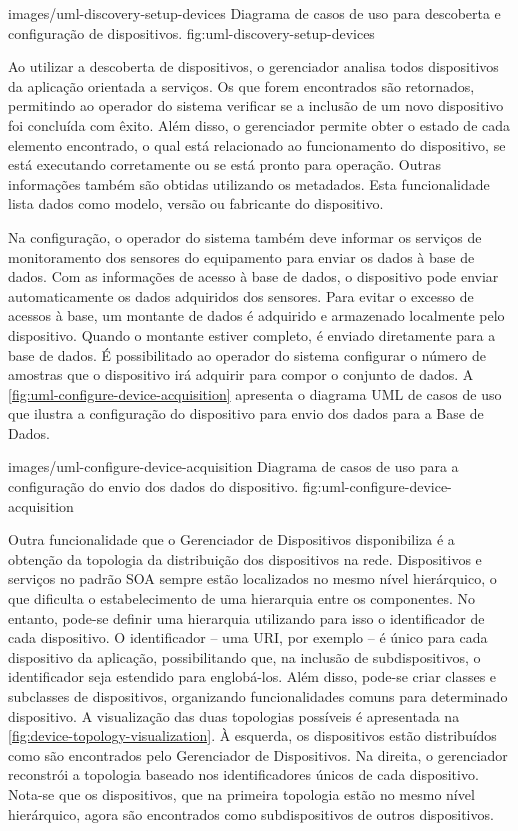   {images/uml-discovery-setup-devices}
  {Diagrama de casos de uso para descoberta e configuração de dispositivos.}
  {fig:uml-discovery-setup-devices}

Ao utilizar a descoberta de dispositivos, o gerenciador analisa todos dispositivos da aplicação
orientada a serviços. Os que forem encontrados são retornados, permitindo ao operador do sistema
verificar se a inclusão de um novo dispositivo foi concluída com êxito. Além disso, o gerenciador
permite obter o estado de cada elemento encontrado, o qual está relacionado ao funcionamento do
dispositivo, se está executando corretamente ou se está pronto para operação. Outras informações
também são obtidas utilizando os metadados. Esta funcionalidade lista dados como modelo, versão ou
fabricante do dispositivo.

Na configuração, o operador do sistema também deve informar os serviços de monitoramento dos
sensores do equipamento para enviar os dados à base de dados. Com as informações de acesso à base de
dados, o dispositivo pode enviar automaticamente os dados adquiridos dos sensores. Para evitar o
excesso de acessos à base, um montante de dados é adquirido e armazenado localmente pelo
dispositivo. Quando o montante estiver completo, é enviado diretamente para a base de dados. É
possibilitado ao operador do sistema configurar o número de amostras que o dispositivo irá adquirir
para compor o conjunto de dados. A \cref{fig:uml-configure-device-acquisition} apresenta o diagrama
\gls{UML} de casos de uso que ilustra a configuração do dispositivo para envio dos dados para a Base
de Dados.

  {images/uml-configure-device-acquisition}
  {Diagrama de casos de uso para a configuração do envio dos dados do dispositivo.}
  {fig:uml-configure-device-acquisition}

Outra funcionalidade que o Gerenciador de Dispositivos disponibiliza é a obtenção da topologia da
distribuição dos dispositivos na rede. Dispositivos e serviços no padrão \gls{SOA} sempre estão
localizados no mesmo nível hierárquico, o que dificulta o estabelecimento de uma hierarquia entre os
componentes. No entanto, pode-se definir uma hierarquia utilizando para isso o identificador de cada
dispositivo. O identificador -- uma \gls{URI}, por exemplo -- é único para cada dispositivo da
aplicação, possibilitando que, na inclusão de subdispositivos, o identificador seja estendido para
englobá-los. Além disso, pode-se criar classes e subclasses de dispositivos, organizando
funcionalidades comuns para determinado dispositivo. A visualização das duas topologias possíveis é
apresentada na \cref{fig:device-topology-visualization}. À esquerda, os dispositivos estão
distribuídos como são encontrados pelo Gerenciador de Dispositivos. Na direita, o gerenciador
reconstrói a topologia baseado nos identificadores únicos de cada dispositivo. Nota-se que os
dispositivos, que na primeira topologia estão no mesmo nível hierárquico, agora são encontrados como
subdispositivos de outros dispositivos.

